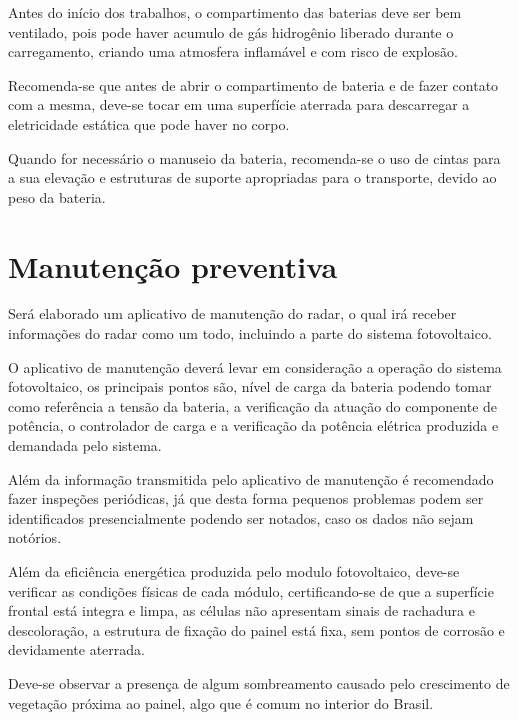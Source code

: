 Antes do início dos trabalhos, o compartimento das baterias deve ser bem ventilado, pois pode haver acumulo de gás hidrogênio liberado durante o carregamento, criando uma atmosfera inflamável e com risco de explosão. 

Recomenda-se que antes de abrir o compartimento de bateria e de fazer contato com a mesma, deve-se tocar em uma superfície aterrada para descarregar a eletricidade estática que pode haver no corpo.

Quando for necessário o manuseio da bateria, recomenda-se o uso de cintas para a sua elevação e estruturas de suporte apropriadas para o transporte, devido ao peso da bateria. 


\section{Manutenção preventiva}

Será elaborado um aplicativo de manutenção do radar, o qual irá receber informações do radar como um todo, incluindo a parte do sistema fotovoltaico.

O aplicativo de manutenção deverá levar em consideração a operação do sistema fotovoltaico, os principais pontos são, nível de carga da bateria podendo tomar como referência a tensão da bateria, a verificação da atuação do componente de potência, o controlador de carga e a verificação da potência elétrica produzida e demandada pelo sistema.

Além da informação transmitida pelo aplicativo de manutenção é recomendado fazer inspeções periódicas, já que desta forma pequenos problemas podem ser identificados presencialmente podendo ser notados, caso os dados não sejam notórios.

Além da eficiência energética produzida pelo modulo fotovoltaico, deve-se verificar as condições físicas de cada módulo, certificando-se de que a superfície frontal está integra e limpa, as células não apresentam sinais de rachadura e descoloração, a estrutura de fixação do painel está fixa, sem pontos de corrosão e devidamente aterrada.

Deve-se observar a presença de algum sombreamento causado pelo crescimento de vegetação próxima ao painel, algo que é comum no interior do Brasil.

